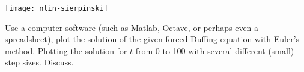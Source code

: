 \documentclass{ximera}
\begin{document}
\texttt{[image: nlin-sierpinski]}


\begin{exercise}%
    Use a computer software (such as Matlab, Octave, or perhaps even a spreadsheet), plot the solution of the given forced Duffing equation with Euler's method.  Plotting the solution for $t$ from 0 to 100 with several different (small) step sizes. Discuss.
\end{exercise}
\end{document}
